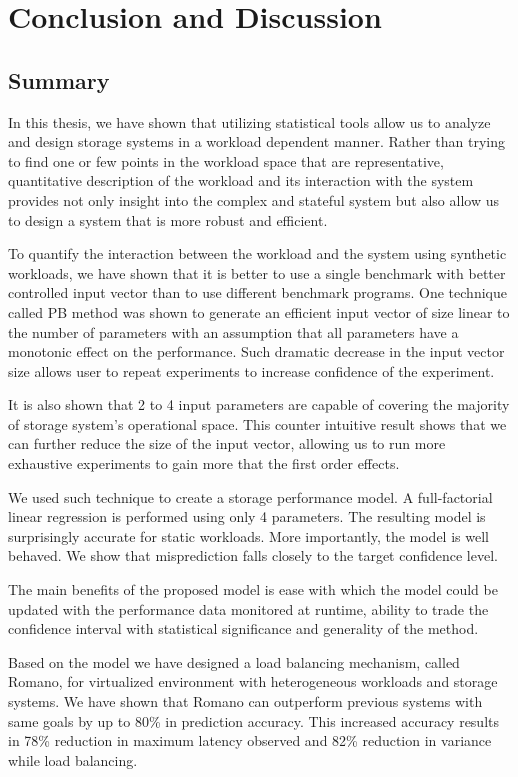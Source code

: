 \chapter{Conclusion and Discussion}
\label{CONCLUSION}

\section{Summary}
In this thesis, we have shown that utilizing statistical tools allow us to analyze and design storage systems in a workload dependent manner. 
Rather than trying to find one or few points in the workload space that are representative, quantitative description of the workload and its interaction with the system provides not only insight into the complex and stateful system but also allow us to design a system that is more robust and efficient. 

To quantify the interaction between the workload and the system using synthetic workloads, we have shown that it is better to use a single benchmark with better controlled input vector than to use different benchmark programs. 
One technique called PB method was shown to generate an efficient input vector of size linear to the number of parameters with an assumption that all parameters have a monotonic effect on the performance.
Such dramatic decrease in the input vector size allows user to repeat experiments to increase confidence of the experiment.

It is also shown that 2 to 4 input parameters are capable of covering the majority of storage system's operational space. 
This counter intuitive result shows that we can further reduce the size of the input vector, allowing us to run more exhaustive experiments to gain more that the first order effects. 

We used such technique to create a storage performance model.
A full-factorial linear regression is performed using only 4 parameters.
The resulting model is surprisingly accurate for static workloads.
More importantly, the model is well behaved. 
We show that misprediction falls closely to the target confidence level. 

The main benefits of the proposed model is ease with which the model could be updated with the performance data monitored at runtime, ability to trade the confidence interval with statistical significance and generality of the method. 

Based on the model we have designed a load balancing mechanism, called Romano, for virtualized environment with heterogeneous workloads and storage systems.
We have shown that Romano can outperform previous systems with same goals by up to 80\% in prediction accuracy. This increased accuracy results in 78\% reduction in maximum latency observed and 82\% reduction in variance while load balancing.

